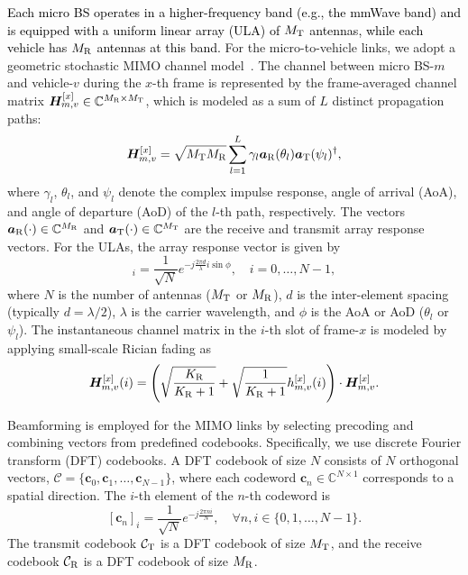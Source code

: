\documentclass[conference, a4paper]{IEEEtran}
\theoremstyle{remark}
\begin{document}
\textcolor{black}{
Each micro BS operates in a higher-frequency band (e.g., the mmWave band) and is equipped with a uniform linear array (ULA) of $M_{\rm T}$ antennas, while each vehicle has $M_{\rm R}$ antennas at this band.
}
For the micro-to-vehicle links, we adopt a geometric stochastic MIMO channel model~\cite{molisch04}. The channel between micro BS-$m$ and vehicle-$v$ during the $x$-th frame is represented by the frame-averaged channel matrix $\boldsymbol{H}_{m,v}^{[x]} \in \mathbb{C}^{M_{\rm R} \times M_{\rm T}}$, which is modeled as a sum of $L$ distinct propagation paths:
\begin{equation}
\label{eq:MIMO_channel}
    \boldsymbol{H}_{m,v}^{[x]} = \sqrt{M_{\rm T} M_{\rm R}} \sum_{l=1}^{L} \gamma_{l} \boldsymbol{a}_{\rm R}(\theta_{l}) \boldsymbol{a}_{\rm T}(\psi_{l})^{\dagger},
\end{equation}
where $\gamma_l$, $\theta_l$, and $\psi_l$ denote the complex impulse response, angle of arrival (AoA), and angle of departure (AoD) of the $l$-th path, respectively. The vectors $\boldsymbol{a}_{\rm R}(\cdot) \in \mathbb{C}^{M_{\rm R}}$ and $\boldsymbol{a}_{\rm T}(\cdot) \in \mathbb{C}^{M_{\rm T}}$ are the receive and transmit array response vectors. For the ULAs, the array response vector is given by
\begin{equation}
    [\boldsymbol{a}(\phi)]_i = \frac{1}{\sqrt{N}} e^{-j \frac{2\pi d}{\lambda} i \sin\phi}, \quad i=0, \dots, N-1,
\end{equation}
where $N$ is the number of antennas ($M_{\rm T}$ or $M_{\rm R}$), $d$ is the inter-element spacing (typically $d=\lambda/2$), $\lambda$ is the carrier wavelength, and $\phi$ is the AoA or AoD ($\theta_l$ or $\psi_l$).
The instantaneous channel matrix in the $i$-th slot of frame-$x$ is modeled by applying small-scale Rician fading as
\begin{equation}
    \boldsymbol{H}_{m,v}^{[x]}(i)=\left(\sqrt{\frac{K_{\rm R}}{K_{\rm R}+1}} + \sqrt{\frac{1}{K_{\rm R}+1}} h_{m,v}^{[x]}(i)\right) \cdot \boldsymbol{H}_{m,v}^{[x]}.
    \label{eq:instantaneous channel matrix}
\end{equation}

Beamforming is employed for the MIMO links by selecting precoding and combining vectors from predefined codebooks. 
Specifically, we use discrete Fourier transform (DFT) codebooks. A DFT codebook of size $N$ consists of $N$ orthogonal vectors, $\mathcal{C} = \{\boldsymbol{c}_0, \boldsymbol{c}_1, \dots, \boldsymbol{c}_{N-1}\}$, where each codeword $\boldsymbol{c}_n \in \mathbb{C}^{N \times 1}$ corresponds to a spatial direction. The $i$-th element of the $n$-th codeword is
\begin{equation}
\label{eq:dft_codebook}
    [\boldsymbol{c}_n]_i = \frac{1}{\sqrt{N}} e^{-j \frac{2\pi ni}{N}}, \quad \forall n, i \in \{0, 1, \dots, N-1\}.
\end{equation}
The transmit codebook $\mathcal{C}_{\rm T}$ is a DFT codebook of size $M_{\rm T}$, and the receive codebook $\mathcal{C}_{\rm R}$ is a DFT codebook of size $M_{\rm R}$. 
\end{document}
